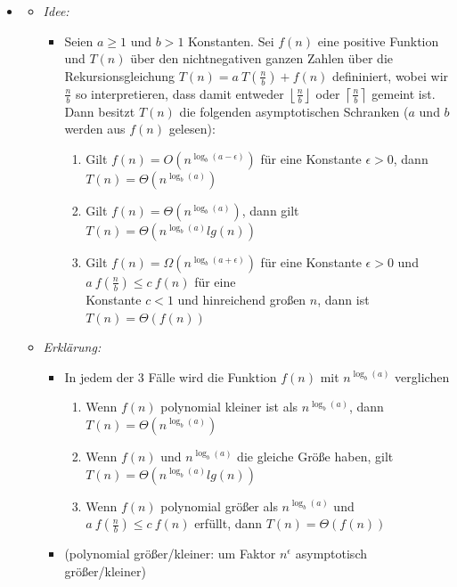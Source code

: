 \documentclass[
    12pt,
    a4paper,
    ngerman,
    color=3b,%
    marginpar=false,
    colorback=false,
    leqno,
]{tudaexercise}
\begin{document}
\begin{itemize}
    \item {}
          \begin{itemize}
              \item \textit{Idee:}
                    \begin{itemize}
                        \item[]
                              Seien $a \geq 1$ und $b > 1$ Konstanten. Sei $f(n)$ eine positive Funktion und $T(n)$
                              über den nichtnegativen ganzen Zahlen über die Rekursionsgleichung $T(n) = a~T(\frac{n}{b}) + f(n)$
                              defininiert, wobei wir $\frac{n}{b}$ so interpretieren, dass damit entweder $\left \lfloor \frac{n}{b} \right \rfloor$
                              oder $\left \lceil \frac{n}{b} \right \rceil$ gemeint ist. Dann besitzt $T(n)$ die folgenden asymptotischen Schranken
                              ($a$ und $b$ werden aus $f(n)$ gelesen):
                              \begin{enumerate}
                                  \item Gilt $f(n) = O(n^{\log_b (a - \epsilon)})$ für eine Konstante $\epsilon > 0$, dann $T(n) = \Theta(n^{\log_b (a)})$
                                  \item Gilt $f(n) = \Theta(n^{\log_b (a)})$, dann gilt $T(n) = \Theta(n^{\log_b (a)} lg(n))$
                                  \item Gilt $f(n) = \Omega(n^{\log_b (a+\epsilon)})$ für eine Konstante $\epsilon > 0$ und $a~f(\frac{n}{b}) \leq c~f(n)$
                                        für eine \\ Konstante $c < 1$ und hinreichend großen $n$, dann ist $T(n) = \Theta(f(n))$
                              \end{enumerate}
                    \end{itemize}

              \item \textit{Erklärung:}
                    \begin{itemize}
                        \item In jedem der 3 Fälle wird die Funktion $f(n)$ mit $n^{\log_b(a)}$ verglichen
                              \begin{enumerate}
                                  \item Wenn $f(n)$ polynomial kleiner ist als $n^{\log_b(a)}$, dann $T(n) = \Theta(n^{\log_b(a)})$
                                  \item Wenn $f(n)$ und $n^{\log_b(a)}$ die gleiche Größe haben, gilt $T(n) = \Theta(n^{\log_b (a)} lg(n))$
                                  \item Wenn $f(n)$ polynomial größer als $n^{\log_b(a)}$ und $a~f(\frac{n}{b}) \leq c~f(n)$ erfüllt, dann $T(n) = \Theta(f(n))$
                              \end{enumerate}
                        \item (polynomial größer/kleiner: um Faktor $n^\epsilon$ asymptotisch größer/kleiner)
                    \end{itemize}


\end{itemize}
\end{itemize}
\end{document}
